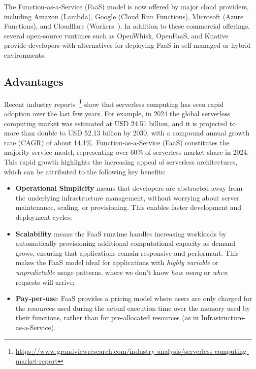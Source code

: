 The Function-as-a-Service (FaaS) model is now offered by major cloud providers, including Amazon (Lambda\cite{aws_lambda}), Google (Cloud Run Functions\cite{google_cloud_run_functions}), Microsoft (Azure Functions\cite{azure_functions}), and Cloudflare (Workers~\cite{cloudflare_workers}). In addition to these commercial offerings, several open-source runtimes such as OpenWhisk\cite{open_whisk}, OpenFaaS\cite{openfaas}, and Knative\cite{knative} provide developers with alternatives for deploying FaaS in self-managed or hybrid environments.

\subsection{Advantages}
Recent industry reports~\footnote{\url{https://www.grandviewresearch.com/industry-analysis/serverless-computing-market-report}} show that serverless computing has seen rapid adoption over the last few years. For example, in 2024 the global serverless computing market was estimated at USD 24.51 billion, and it is projected to more than double to USD 52.13 billion by 2030, with a compound annual growth rate (CAGR) of about 14.1\%. Function-as-a-Service (FaaS) constitutes the majority service model, representing over 60\% of serverless market share in 2024. This rapid growth highlights the increasing appeal of serverless architectures, which can be attributed to the following key benefits:

\begin{itemize}
    \item{\textbf{Operational Simplicity} means that developers are abstracted away from the underlying infrastructure management, without worrying about server maintenance, scaling, or provisioning. This enables faster development and deployment cycles;}
    \item{\textbf{Scalability} means the FaaS runtime handles increasing workloads by automatically provisioning additional computational capacity as demand grows, ensuring that applications remain responsive and performant. This makes the FaaS model ideal for applications with \textit{highly variable} or \textit{unpredictable} usage patterns, where we don't know \textit{how many} or \textit{when} requests will arrive;}
    \item{\textbf{Pay-per-use}: FaaS provides a pricing model where users are only charged for the resources used during the actual execution time over the memory used by their functions, rather than for pre-allocated resources (as in Infrastructure-as-a-Service).}
\end{itemize}

